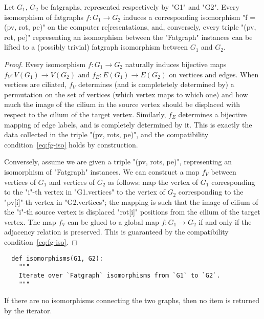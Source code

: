 \begin{lemma}
  Let $G_1$, $G_2$ be fatgraphs, represented respectively by "G1" and
  "G2". Every isomorphism of fatgraphs $f: G_1 \to G_2$ induces a
  corresponding isomorphism "f = (pv, rot, pe)" on the computer
  re[resentations, and, conversely, every triple "(pv, rot, pe)"
  representing an isomorphism between the "Fatgraph" instances can be
  lifted to a (possibly trivial) fatgraph isomorphism between $G_1$
  and $G_2$.
\end{lemma}
\begin{proof}
  Every isomorphism $f: G_1 \to G_2$ naturally induces bijective maps
  $f_V: V(G_1) \to V(G_2)$ and $f_E: E(G_1) \to E(G_2)$ on vertices
  and edges.  When vertices are ciliated, $f_V$ determines (and is
  completetely determined by) a permutation on the set of vertices
  (which vertex maps to which one) and how much the image of the
  cilium in the source vertex should be displaced with respect to the
  cilium of the target vertex.  Similarly, $f_E$ determines a
  bijective mapping of edge labels, and is completely determined by
  it.  This is exactly the data collected in the triple "(pv, rots, pe)", 
  and the compatibility condition~\eqref{eq:fg-iso} holds by
  construction.

  Conversely, assume we are given a triple "(pv, rots, pe)",
  representing an isomorphism of "Fatgraph" instances.  We can
  construct a map $f_V$ between vertices of $G_1$ and vertices of
  $G_2$ as follows: map the vertex of $G_1$ corresponding to the
  "i"-th vertex in "G1.vertices" to the vertex of $G_2$ corresponding
  to the "pv[i]"-th vertex in "G2.vertices"; the mapping is such that
  the image of cilium of the "i"-th source vertex is displaced
  "rot[i]" positions from the cilium of the target vertex.  The map
  $f_V$ can be glued to a global map $f: G_1 \to G_2$ if and only if
  the adjacency relation is preserved.  This is guaranteed by the
  compatibility condition~\eqref{eq:fg-iso}.
\end{proof}

\begin{lstlisting}
  def isomorphisms(G1, G2):
    """
    Iterate over `Fatgraph` isomorphisms from `G1` to `G2`.
    """
\end{lstlisting}
If there are no isomorphisms connecting the two graphs, then no
item is returned by the iterator.

